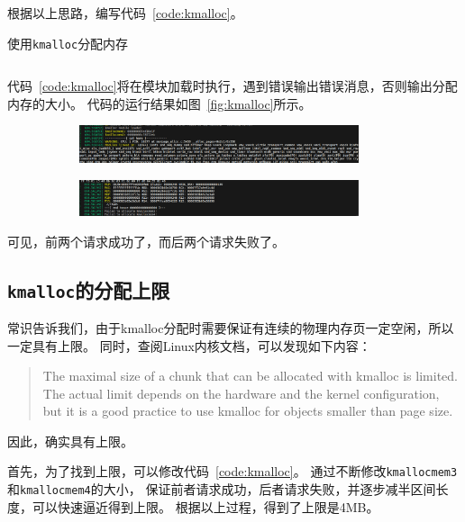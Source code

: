 \documentclass[a4paper,twoside]{article}
\begin{document}
\begin{spacing}{1.2}
根据以上思路，编写代码~\ref{code:kmalloc}。
\begin{listing}[htb]
	\caption{使用\texttt{kmalloc}分配内存}
	\label{code:kmalloc}
	\inputminted[firstline=14,lastline=42]{c}{../code/1/1.c}
\end{listing}
代码~\ref{code:kmalloc}将在模块加载时执行，遇到错误输出错误消息，否则输出分配内存的大小。
代码的运行结果如图~\ref{fig:kmalloc}所示。
\begin{figure}[htb]
	\centering
	\caption{使用\texttt{kmalloc}分配内存}
	\label{fig:kmalloc}
	\begin{subfigure}{0.45\textwidth}
		\includegraphics[width=0.9\textwidth]{images/km1.png}
	\end{subfigure}
	\begin{subfigure}{0.45\textwidth}
		\includegraphics[width=0.9\textwidth]{images/km2.png}
	\end{subfigure}
\end{figure}

可见，前两个请求成功了，而后两个请求失败了。

\subsection{\texttt{kmalloc}的分配上限}

常识告诉我们，由于kmalloc分配时需要保证有连续的物理内存页一定空闲，所以一定具有上限。
同时，查阅Linux内核文档，可以发现如下内容：
\begin{quotation}
	The maximal size of a chunk that can be allocated with kmalloc is limited. The actual limit depends on the hardware and the kernel configuration, but it is a good practice to use kmalloc for objects smaller than page size.
\end{quotation}
因此，确实具有上限。

首先，为了找到上限，可以修改代码~\ref{code:kmalloc}。
通过不断修改\texttt{kmallocmem3}和\texttt{kmallocmem4}的大小，
保证前者请求成功，后者请求失败，并逐步减半区间长度，可以快速逼近得到上限。
根据以上过程，得到了上限是4MB。


\end{spacing}
\end{document}
